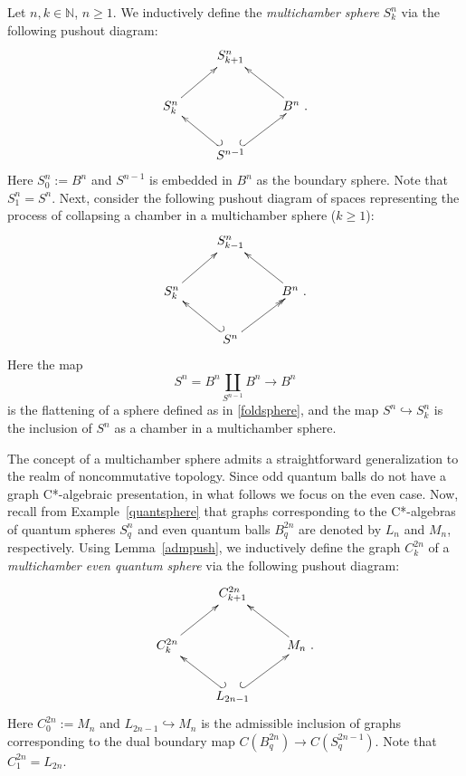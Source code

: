\documentclass[12pt,times,a4paper]{amsart}
\numberwithin{equation}{section}
\numberwithin{equation}{section}
\begin{document}
Let $n,k\in\mathbb{N}$, $n\geq 1$. We inductively define the {\em multichamber sphere} $S^n_k$ via the following pushout diagram:
\begin{equation}\label{multicham}
\xymatrix{
& S_{k+1}^{n} &\\
S_k^n \ar[ur] & & B^{n}~. \ar[ul]\\
& S^{n-1} \ar@{^{(}->}[ur] \ar@{_{(}->}[ul] &
}
\end{equation}
Here $S^n_0:=B^n$ and $S^{n-1}$ is embedded in $B^n$ as the boundary sphere. Note that $S^n_1=S^n$. 
Next, consider the following pushout diagram of spaces representing the process of collapsing a chamber in a multichamber sphere ($k\geq 1$):
\begin{equation}\label{collapse}
\xymatrix{
& S_{k-1}^{n} &\\
S_k^n \ar[ur] & & B^{n}~. \ar[ul]\\
& S^{n} \ar@{>>}[ur] \ar@{_{(}->}[ul] &
}
\end{equation}
Here the map 
\begin{equation}
S^n=B^n\underset{S^{n-1}}{\amalg}B^n\longrightarrow B^n
\end{equation} 
is the flattening of a sphere defined as in \eqref{foldsphere}, and the map $S^n\hookrightarrow S^n_k$ 
is the inclusion of $S^n$ as a chamber in a multichamber sphere.


The concept of a multichamber sphere admits a straightforward generalization to the realm of noncommutative topology. Since odd quantum balls do not 
have a graph C*-algebraic presentation, in what follows we focus on the even case. 
Now, recall from Example~\ref{quantsphere} that graphs corresponding to the C*-algebras of quantum spheres $S^n_q$ and even quantum balls 
$B^{2n}_q$ are denoted by $L_n$ and $M_{n}$, respectively.
Using Lemma~\ref{admpush}, we inductively define the graph $C_k^{2n}$ of a {\em multichamber even quantum sphere} via the following pushout diagram:
\begin{equation}
\xymatrix{
& C_{k+1}^{2n} &\\
C_k^{2n} \ar[ur] & & M_{n}~. \ar[ul]\\
& L_{2n-1} \ar@{^{(}->}[ur] \ar@{_{(}->}[ul] &
}
\end{equation}
Here $C^{2n}_0:=M_n$ and $L_{2n-1}\hookrightarrow M_n$ is the admissible inclusion of graphs corresponding to the dual boundary map 
$C(B^{2n}_q)\to C(S^{2n-1}_q)$. Note that $C^{2n}_1=L_{2n}$.
\end{document}
